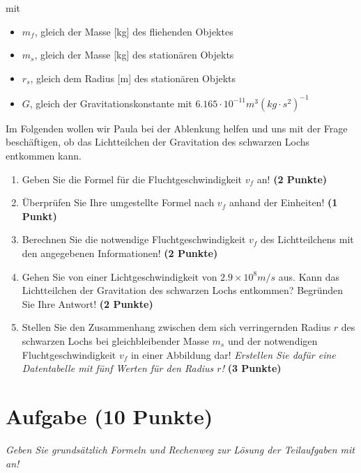 \documentclass[a4paper, 9pt]{scrartcl}\usepackage[]{graphicx}\usepackage[]{xcolor}
\begin{document}
mit

\begin{itemize}[noitemsep]
\item $m_f$, gleich der Masse [kg] des fliehenden Objektes
\item $m_s$, gleich der Masse [kg] des stationären Objekts
\item $r_s$, gleich dem Radius [m] des stationären Objekts  
\item $G$, gleich der Gravitationskonstante mit $6.165 \cdot 10^{-11} m^3(kg \cdot s^2)^{-1}$ 
\end{itemize}

Im Folgenden wollen wir Paula bei der Ablenkung helfen und uns mit der Frage beschäftigen, ob das Lichtteilchen der Gravitation des schwarzen Lochs entkommen kann.

\begin{enumerate}
\item Geben Sie die Formel für die Fluchtgeschwindigkeit $v_f$ an! \textbf{(2 Punkte)}
\item Überprüfen Sie Ihre umgestellte Formel nach $v_f$ anhand der Einheiten! \textbf{(1 Punkt)} 
\item Berechnen Sie die notwendige Fluchtgeschwindigkeit $v_f$ des Lichtteilchens mit den angegebenen Informationen! \textbf{(2 Punkte)}
\item Gehen Sie von einer Lichtgeschwindigkeit von $\ensuremath{2.9\times 10^{8}}m/s$ aus. Kann das Lichtteilchen der Gravitation des schwarzen Lochs entkommen? Begründen Sie Ihre Antwort! \textbf{(2 Punkte)}
\item Stellen Sie den Zusammenhang zwischen dem sich verringernden Radius $r$ des schwarzen Lochs bei gleichbleibender Masse $m_s$ und der notwendigen Fluchtgeschwindigkeit $v_f$ in einer Abbildung dar! \textit{Erstellen Sie dafür eine Datentabelle mit fünf Werten für den Radius $r$!} \textbf{(3 Punkte)}
\end{enumerate}

 
\clearpage

\section{Aufgabe \hfill (10 Punkte)}

\textit{Geben Sie grundsätzlich Formeln und Rechenweg zur Lösung der Teilaufgaben mit an!} \\[1Ex]
 
\end{document}
